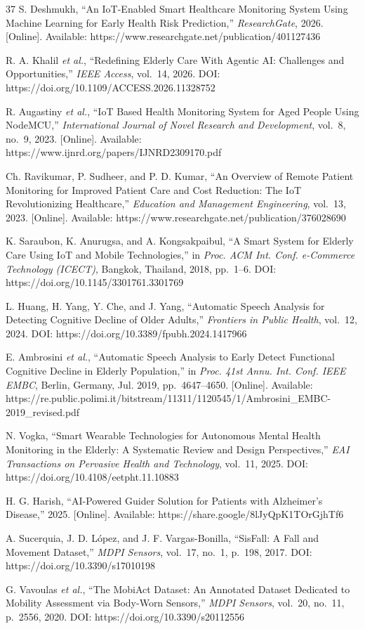 \documentclass[conference]{IEEEtran}
\begin{document}
\begin{thebibliography}{37}
S. Deshmukh, ``An IoT-Enabled Smart Healthcare Monitoring System Using Machine Learning for Early Health Risk Prediction,'' \textit{ResearchGate}, 2026. [Online]. Available: https://www.researchgate.net/publication/401127436

R. A. Khalil \textit{et al.}, ``Redefining Elderly Care With Agentic AI: Challenges and Opportunities,'' \textit{IEEE Access}, vol.~14, 2026. DOI: https://doi.org/10.1109/ACCESS.2026.11328752

R. Augastiny \textit{et al.}, ``IoT Based Health Monitoring System for Aged People Using NodeMCU,'' \textit{International Journal of Novel Research and Development}, vol.~8, no.~9, 2023. [Online]. Available: https://www.ijnrd.org/papers/IJNRD2309170.pdf

Ch. Ravikumar, P. Sudheer, and P. D. Kumar, ``An Overview of Remote Patient Monitoring for Improved Patient Care and Cost Reduction: The IoT Revolutionizing Healthcare,'' \textit{Education and Management Engineering}, vol.~13, 2023. [Online]. Available: https://www.researchgate.net/publication/376028690

K. Saraubon, K. Anurugsa, and A. Kongsakpaibul, ``A Smart System for Elderly Care Using IoT and Mobile Technologies,'' in \textit{Proc. ACM Int. Conf. e-Commerce Technology (ICECT)}, Bangkok, Thailand, 2018, pp.~1--6. DOI: https://doi.org/10.1145/3301761.3301769

L. Huang, H. Yang, Y. Che, and J. Yang, ``Automatic Speech Analysis for Detecting Cognitive Decline of Older Adults,'' \textit{Frontiers in Public Health}, vol.~12, 2024. DOI: https://doi.org/10.3389/fpubh.2024.1417966

E. Ambrosini \textit{et al.}, ``Automatic Speech Analysis to Early Detect Functional Cognitive Decline in Elderly Population,'' in \textit{Proc. 41st Annu. Int. Conf. IEEE EMBC}, Berlin, Germany, Jul. 2019, pp.~4647--4650. [Online]. Available: https://re.public.polimi.it/bitstream/11311/1120545/1/Ambrosini\_EMBC- 2019\_revised.pdf

N. Vogka, ``Smart Wearable Technologies for Autonomous Mental Health Monitoring in the Elderly: A Systematic Review and Design Perspectives,'' \textit{EAI Transactions on Pervasive Health and Technology}, vol.~11, 2025. DOI: https://doi.org/10.4108/eetpht.11.10883

H. G. Harish, ``AI-Powered Guider Solution for Patients with Alzheimer's Disease,'' 2025. [Online]. Available: https://share.google/8lJyQpK1TOrGjhTf6

A. Sucerquia, J. D. L\'{o}pez, and J. F. Vargas-Bonilla, ``SisFall: A Fall and Movement Dataset,'' \textit{MDPI Sensors}, vol.~17, no.~1, p.~198, 2017. DOI: https://doi.org/10.3390/s17010198

G. Vavoulas \textit{et al.}, ``The MobiAct Dataset: An Annotated Dataset Dedicated to Mobility Assessment via Body-Worn Sensors,'' \textit{MDPI Sensors}, vol.~20, no.~11, p.~2556, 2020. DOI: https://doi.org/10.3390/s20112556

\end{thebibliography}
\end{document}
